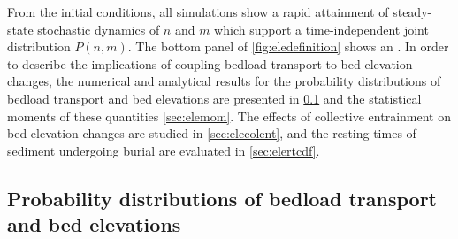 From the initial conditions, all simulations show a rapid attainment of steady-state stochastic dynamics of $n$ and $m$ which support a time-independent joint distribution $P(n,m)$. The bottom panel of \DIFdelbegin {}\DIFdelend \DIFaddbegin {}\DIFaddend \ref{fig:eledefinition} shows an \DIFdelbegin {}\DIFdelend \DIFaddbegin {}\DIFaddend . In order to describe the implications of coupling bedload transport to bed elevation changes, the numerical and analytical results for the probability distributions of bedload transport and bed elevations are presented in \DIFdelbegin {}\DIFdelend \DIFaddbegin {}\DIFaddend \ref{sec:elepdf} and the statistical moments of these quantities \DIFdelbegin {}\DIFdelend \DIFaddbegin {}\DIFaddend \ref{sec:elemom}. The effects of collective entrainment on bed elevation changes are studied in \DIFdelbegin {}\DIFdelend \DIFaddbegin {}\DIFaddend \ref{sec:elecolent}, and the resting times of sediment undergoing burial are evaluated in \DIFdelbegin {}\DIFdelend \DIFaddbegin {}\DIFaddend \ref{sec:elertcdf}.

\subsection{Probability distributions of bedload transport and bed elevations}
\label{sec:elepdf}

